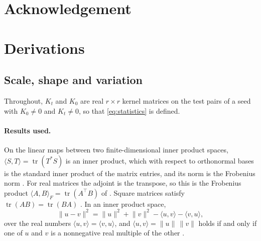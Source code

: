 \documentclass[a4paper,11pt]{article} %
\begin{document}
\section*{Acknowledgement}


\appendix
\section{Derivations}

\subsection{Scale, shape and variation}
\label{sec:identity}

Throughout, $K_t$ and $K_0$ are real $r\times r$ kernel matrices on the test
pairs of a seed with $K_0\neq0$ and $K_t\neq0$, so that \eqref{eq:statistics}
is defined.

\paragraph{Results used.} On the linear maps between two finite-dimensional
inner product spaces, $\langle S,T\rangle=\operatorname{tr}(T^*S)$ is an inner
product, which with respect to orthonormal bases is the standard inner product
of the matrix entries, and its norm is the Frobenius norm
\citep{axlerLinearAlgebraDone2024}. For real matrices the adjoint is the
transpose, so this is the Frobenius product
$\langle A,B\rangle_F=\operatorname{tr}(A^\top B)$ of
\citet{cortesAlgorithmsLearningKernels2024}. Square matrices satisfy
$\operatorname{tr}(AB)=\operatorname{tr}(BA)$
\citep{axlerLinearAlgebraDone2024}. In an inner product space,
\begin{equation*}
  \lVert u-v\rVert^2 = \lVert u\rVert^2 + \lVert v\rVert^2
  - \langle u,v\rangle - \langle v,u\rangle ,
\end{equation*}
over the real numbers $\langle u,v\rangle=\langle v,u\rangle$, and
$\langle u,v\rangle=\lVert u\rVert\,\lVert v\rVert$ holds if and only if one of
$u$ and $v$ is a nonnegative real multiple of the other
\citep{axlerLinearAlgebraDone2024}.
\end{document}
